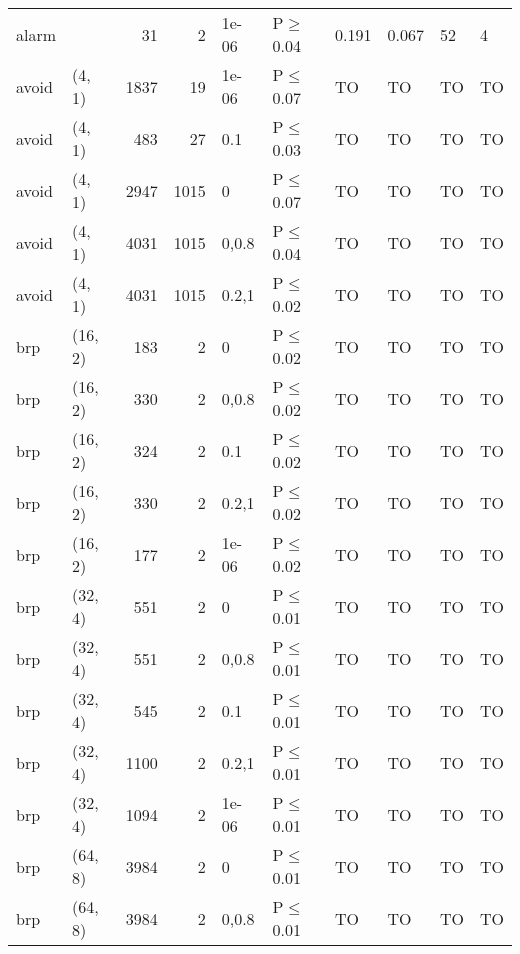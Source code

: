 \begin{longtable}{llrrllllll}
 alarm         &           &     	31 &    2 & 1e-06 & P$\geq$0.04  & 0.191    & 0.067    & 52      & 4      \\
 avoid         & (4, 1)    &   	1837 &   19 & 1e-06 & P$\leq$0.07  & TO       & TO       & TO      & TO     \\
 avoid         & (4, 1)    &    	483 &   27 & 0.1   & P$\leq$0.03  & TO       & TO       & TO      & TO     \\
 avoid         & (4, 1)    &   	2947 & 1015 & 0     & P$\leq$0.07  & TO       & TO       & TO      & TO     \\
 avoid         & (4, 1)    &   	4031 & 1015 & 0,0.8 & P$\leq$0.04  & TO       & TO       & TO      & TO     \\
 avoid         & (4, 1)    &   	4031 & 1015 & 0.2,1 & P$\leq$0.02  & TO       & TO       & TO      & TO     \\
 brp           & (16, 2)   &    	183 &    2 & 0     & P$\leq$0.02  & TO       & TO       & TO      & TO     \\
 brp           & (16, 2)   &    	330 &    2 & 0,0.8 & P$\leq$0.02  & TO       & TO       & TO      & TO     \\
 brp           & (16, 2)   &    	324 &    2 & 0.1   & P$\leq$0.02  & TO       & TO       & TO      & TO     \\
 brp           & (16, 2)   &    	330 &    2 & 0.2,1 & P$\leq$0.02  & TO       & TO       & TO      & TO     \\
 brp           & (16, 2)   &    	177 &    2 & 1e-06 & P$\leq$0.02  & TO       & TO       & TO      & TO     \\
 brp           & (32, 4)   &    	551 &    2 & 0     & P$\leq$0.01  & TO       & TO       & TO      & TO     \\
 brp           & (32, 4)   &    	551 &    2 & 0,0.8 & P$\leq$0.01  & TO       & TO       & TO      & TO     \\
 brp           & (32, 4)   &    	545 &    2 & 0.1   & P$\leq$0.01  & TO       & TO       & TO      & TO     \\
 brp           & (32, 4)   &   	1100 &    2 & 0.2,1 & P$\leq$0.01  & TO       & TO       & TO      & TO     \\
 brp           & (32, 4)   &   	1094 &    2 & 1e-06 & P$\leq$0.01  & TO       & TO       & TO      & TO     \\
 brp           & (64, 8)   &   	3984 &    2 & 0     & P$\leq$0.01  & TO       & TO       & TO      & TO     \\
 brp           & (64, 8)   &   	3984 &    2 & 0,0.8 & P$\leq$0.01  & TO       & TO       & TO      & TO     \\

\end{longtable}
